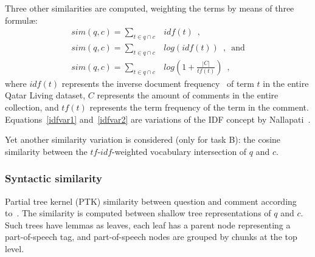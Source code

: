 Three other similarities are computed, weighting the terms by means of three 
formul\ae: 
%
\begin{eqnarray}
 sim(q, c)=\sum_{t\in q\cap c} & idf(t) \enspace,		\\
 sim(q, c)=\sum_{t\in q\cap c} & log(idf(t)) \enspace, \enspace \mathrm{and} 
\label{idfvar1}\\
 sim(q, c)=\sum_{t\in q\cap c} & log\left(1 + \frac{|C|}{tf(t)}\right) \enspace 
,
\label{idfvar2}
\end{eqnarray}
% 
where $idf(t)$ represents the inverse document frequency~\cite{Jones:1972} of 
term $t$ in the entire Qatar Living dataset, $C$ represents the amount of 
comments in the entire collection, and $tf(t)$ represents the term frequency of 
the term in the comment. Equations~\ref{idfvar1} and~\ref{idfvar2} are 
variations of the IDF concept by Nallapati~.


Yet another similarity variation is considered (only for task B): the cosine 
similarity between the $tf$-$idf$-weighted vocabulary intersection of $q$ and 
$c$.


\subsubsection{Syntactic similarity }
\label{sub:syntactic}

Partial tree kernel (PTK) similarity between question and comment according 
to~\cite{Moschitti:2006}. The similarity is computed between shallow tree  
representations of $q$ and $c$. Such trees have lemmas as leaves, each leaf has 
a parent node representing a part-of-speech tag, and part-of-speech nodes are 
grouped by chunks at the top level.

